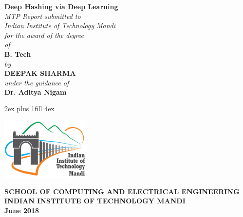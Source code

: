 \thispagestyle{empty}
\setcounter{page}{0}
\vglue 0in
\begin{center}
	{\Large{\bf Deep Hashing via Deep Learning}}\\[10ex]
	{\em MTP Report submitted to}\\
	{\em Indian Institute of Technology Mandi}\\
	{\em for the award of the degree}\\[2ex]
	{\em of}\\[5ex]
	{\large \bf  B. Tech} \\ [2ex]
	{\normalsize \em by}\\[5ex]
	{\large{\bf DEEPAK SHARMA}}\\[2ex]
	{\em under the guidance of}\\[2ex]
	{\bf Dr. Aditya Nigam}
\end{center}

\vglue 2ex plus 1fill  %
\vglue 4ex
\centerline{\includegraphics[width=4.5cm]{iitmandi.eps}}

\begin{center}
	{\normalsize \bf SCHOOL OF COMPUTING AND ELECTRICAL ENGINEERING}\\[1ex]
	{\large \bf INDIAN INSTITUTE OF TECHNOLOGY MANDI}\\[1ex]
	{\bf June 2018} 
\end{center}
\clearpage
\thispagestyle{empty}


